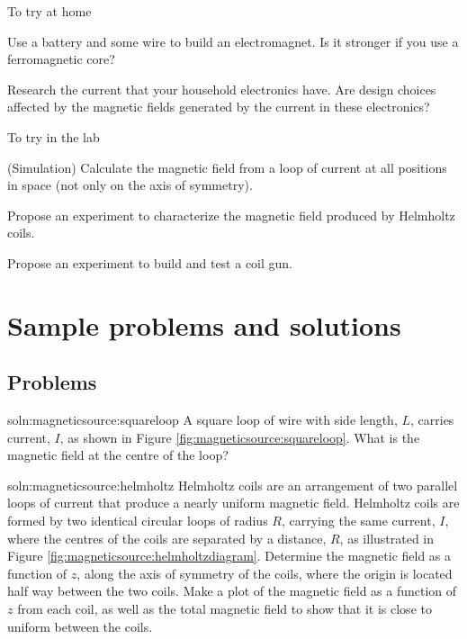 \begin{chapteractivity}{To try at home}
{
\item Use a battery and some wire to build an electromagnet. Is it stronger if you use a ferromagnetic core?
\item Research the current that your household electronics have. Are design choices affected by the magnetic fields generated by the current in these electronics?
}
\end{chapteractivity}

\begin{chapteractivity}{To try in the lab}
{
\item (Simulation) Calculate the magnetic field from a loop of current at all positions in space (not only on the axis of symmetry). 
\item Propose an experiment to characterize the magnetic field produced by Helmholtz coils.
\item Propose an experiment to build and test a coil gun.
}
\end{chapteractivity}

\newpage
\section{Sample problems and solutions}
\subsection{Problems}
\begin{problem}{soln:magneticsource:squareloop}
{\label{prob:magneticsource:squareloop} 
A square loop of wire with side length, $L$, carries current, $I$, as shown in Figure \ref{fig:magneticsource:squareloop}. What is the magnetic field at the centre of the loop?
}
\end{problem}

\begin{problem}{soln:magneticsource:helmholtz}{\label{prob:magneticsource:helmholtz} 
Helmholtz coils are an arrangement of two parallel loops of current that produce a nearly uniform magnetic field. Helmholtz coils are formed by two identical circular loops of radius $R$, carrying the same current, $I$, where the centres of the coils are separated by a distance, $R$, as illustrated in Figure \ref{fig:magneticsource:helmholtzdiagram}. Determine the magnetic field as a function of $z$, along the axis of symmetry of the coils, where the origin is located half way between the two coils. Make a plot of the magnetic field as a function of $z$ from each coil, as well as the total magnetic field to show that it is close to uniform between the coils.
}
\end{problem}

